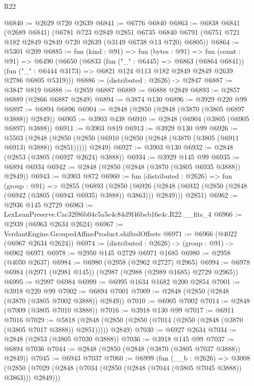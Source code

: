 \begin{lexlean}{R22}
\begin{coremodule}
@6840 := @2629 @720 @2639
@6841 := @6776 @6840
@6863 := @6838
    @6841
    (@2689 @6841)
    (@6781
      @723
      @2849
      @2851
      @6735
      @6840
      @6791
      (@6751 @721 @182 @2849 @2849 @720 @2639 (@3149 @6738 @13 @720) @6805))
@6864 := @5301 @209
@6885 := fun (kind : @91) =>
  fun (bytes : @91) =>
  fun (count : @91) =>
  @6490
    (@6650
      (@6833
        (fun ("_" : @6445) => @6863 (@6864 @6841))
        (fun ("_" : @6444 @3173) => @6821 @124 @113 @182 @2849 @2849 @2639 @2786 @6805 @5319)))
@6886 := (distributed : @2626) -> @2847
@6887 := @3847 @819
@6888 := @2859 @6887
@6889 := @6888 @2849
@6893 := @2857 @6889 (@2866 @6887 @2849)
@6894 := @3874 @130
@6896 := @3929 @220 @99
@6897 := @6894 @6896
@6904 := @2848 (@2850 (@2848 (@3870 (@3805 @6897 @3888)) @2849))
@6905 := @3903 @438
@6910 := @2848 (@6904 (@3805 (@6905 @6897) @3888))
@6911 := @3903 @819
@6913 := @3929 @130 @99
@6926 := @5503
    (@2848 (@2850 (@2850 (@6910 (@2850 (@2848 (@3870 (@3805 (@6911 @6913) @3888)) @2851))))) @2849)
@6927 := @3903 @130
@6932 := @2848 (@2853 (@3805 (@6927 @2624) @3888))
@6934 := @3929 @145 @99
@6935 := @6894 @6934
@6942 := @2848 (@2850 (@2848 (@3870 (@3805 @6935 @3888)) @2849))
@6943 := @3903 @872
@6960 := fun (distributed : @2626) =>
  fun (group : @91) =>
  @2855
    (@6893
      (@2850
        (@6926 (@2848 (@6932 (@2850 (@2848 (@6942 (@3805 (@6943 @6935) @3888)) @3863))) @2849)))
      @2851)
@6962 := @2936 @145 @2729
@6963 := LexLeanPreserve.Cac32f86b04c5a5e4c84d9f46beb16e4c.R22.__fits_4
@6966 := @2939 (@6963 @2634 @2624)
@6967 := VerdantEngine.GroupedAffineProduct.shiftedOffsets
@6971 := @6966 (@4022 (@6967 @2634 @2624))
@6974 := (distributed : @2626) -> (group : @91) -> @6962 @6971
@6978 := @2950 @145 @2729 @6971 @1685
@6980 := @2958 (@4050 @2637)
@6984 := @6980 (@2958 (@2962 @2727) @2965)
@6994 := @6978 @6984 (@2971 (@2981 @145)) (@2987 (@2988 (@2989 @1685) @2729 @2965))
@6995 := @2997 @6984
@6999 := @6995 @1634 @1682 @200 @2854
@7001 := @3918 @220 @99
@7002 := @6894 @7001
@7009 := @2848 (@2850 (@2848 (@3870 (@3805 @7002 @3888)) @2849))
@7010 := @6905 @7002
@7014 := @2848 (@7009 (@3805 @7010 @3888))
@7016 := @3918 @130 @99
@7017 := @6911 @7016
@7029 := @5818
    (@2848 (@2850 (@2850 (@7014 (@2850 (@2848 (@3870 (@3805 @7017 @3888)) @2851))))) @2849)
@7030 := @6927 @2634
@7034 := @2848 (@2853 (@3805 @7030 @3888))
@7036 := @3918 @145 @99
@7037 := @6894 @7036
@7044 := @2848 (@2850 (@2848 (@3870 (@3805 @7037 @3888)) @2849))
@7045 := @6943 @7037
@7060 := @6999
    (fun (__b : @2626) =>
    @3008
      (@2850 (@7029 (@2848 (@7034 (@2850 (@2848 (@7044 (@3805 @7045 @3888)) @3863))) @2849)))

\end{coremodule}
\end{lexlean}

